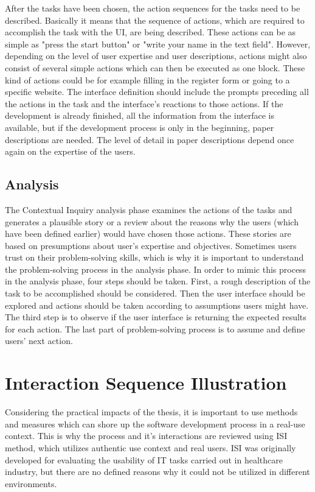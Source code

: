 \documentclass[12pt,a4paper,oneside,pdftex]{report}
\begin{document}
After the tasks have been chosen,  the action sequences for the tasks need to be described. Basically it means that the sequence of actions, which are required to accomplish the task with the UI, are being described. These actions can be as simple as "press the start button" or "write your name in the text field". However, depending on the level of user expertise and user descriptions, actions might also consist of several simple actions which can then be executed as one block. These kind of actions could be for example filling in the register form or going to a specific website. The interface definition should include the prompts preceding all the actions in the task and the interface's reactions to those actions. If the development is already finished, all the information from the interface is available, but if the development process is only in the beginning, paper descriptions are needed. The level of detail in paper descriptions depend once again on the expertise of the users. \cite{RefWorks:26}

\subsection{Analysis}

The Contextual Inquiry analysis phase examines the actions of the tasks and generates a plausible story or a review about the reasons why the users (which have been defined earlier) would have chosen those actions. These stories are based on presumptions about user's expertise and objectives. Sometimes users trust on their problem-solving skills, which is why it is important to understand the problem-solving process in the analysis phase. In order to mimic this process in the analysis phase, four steps should be taken. First, a rough description of the task to be accomplished should be considered. Then the user interface should be explored and actions should be taken according to assumptions users might have. The third step is to observe if the user interface is returning the expected results for each action. The last part of problem-solving process is to assume and define users' next action.\cite{RefWorks:26}

\section{Interaction Sequence Illustration}
\label{sec:isi}
Considering the practical impacts of the thesis, it is important to use methods and measures which can shore up the software development process in a real-use context. This is why the process and it's interactions are reviewed using ISI method, which utilizes 				authentic use context and real users. \cite{RefWorks:17} ISI was originally developed for evaluating the usability of IT tasks carried out in healthcare industry, but there are no defined reasons why it could not be utilized in different environments.
\end{document}
